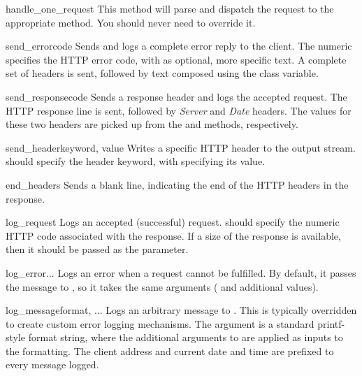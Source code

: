 \begin{methoddesc}{handle_one_request}{}
This method will parse and dispatch
the request to the appropriate  method.  You should
never need to override it.
\end{methoddesc}

\begin{methoddesc}{send_error}{code}
Sends and logs a complete error reply to the client. The numeric
 specifies the HTTP error code, with  as
optional, more specific text. A complete set of headers is sent,
followed by text composed using the 
class variable.
\end{methoddesc}

\begin{methoddesc}{send_response}{code}
Sends a response header and logs the accepted request. The HTTP
response line is sent, followed by \emph{Server} and \emph{Date}
headers. The values for these two headers are picked up from the
 and  methods,
respectively.
\end{methoddesc}

\begin{methoddesc}{send_header}{keyword, value}
Writes a specific HTTP header to the output stream. 
should specify the header keyword, with  specifying
its value.
\end{methoddesc}

\begin{methoddesc}{end_headers}{}
Sends a blank line, indicating the end of the HTTP headers in
the response.
\end{methoddesc}

\begin{methoddesc}{log_request}{}
Logs an accepted (successful) request.  should specify
the numeric HTTP code associated with the response. If a size of
the response is available, then it should be passed as the
 parameter.
\end{methoddesc}

\begin{methoddesc}{log_error}{...}
Logs an error when a request cannot be fulfilled. By default,
it passes the message to , so it takes the
same arguments ( and additional values).
\end{methoddesc}

\begin{methoddesc}{log_message}{format, ...}
Logs an arbitrary message to . This is typically
overridden to create custom error logging mechanisms. The
 argument is a standard printf-style format string,
where the additional arguments to  are applied
as inputs to the formatting. The client address and current date
and time are prefixed to every message logged.
\end{methoddesc}

